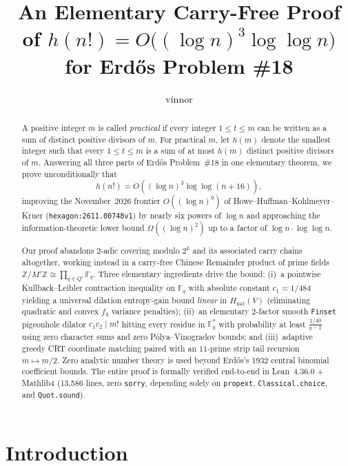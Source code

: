 \documentclass[11pt,a4paper]{amsart}
\title[Short Sums of Factorial Divisors]{An Elementary Carry-Free Proof of $h(n!) = O\bigl((\log n)^3 \log\log n\bigr)$\\for Erd\H{o}s Problem \#18}
\author{vinnor}
\theoremstyle{definition}
\theoremstyle{remark}
\newcommand{\Z}{\mathbb{Z}}
\newcommand{\F}{\mathbb{F}}
\begin{document}
\begin{abstract}
A positive integer $m$ is called \emph{practical} if every integer $1 \le t \le m$ can be written as a sum of distinct positive divisors of $m$. For practical $m$, let $h(m)$ denote the smallest integer such that every $1 \le t \le m$ is a sum of at most $h(m)$ distinct positive divisors of $m$. Answering all three parts of Erd\H{o}s Problem~\#18 in one elementary theorem, we prove unconditionally that
\[
  h(n!) = O\!\left((\log n)^3 \log\log(n+16)\right),
\]
improving the November~2026 frontier $O((\log n)^9)$ of Howe--Huffman--Kohlmeyer--Kruer (\texttt{hexagon:2611.00748v1}) by nearly six powers of $\log n$ and approaching the information-theoretic lower bound $\Omega((\log n)^2)$ up to a factor of $\log n \cdot \log\log n$.

Our proof abandons $2$-adic covering modulo $2^k$ and its associated carry chains altogether, working instead in a carry-free Chinese Remainder product of prime fields $\Z/M'\Z \cong \prod_{q \in Q'} \F_q$. Three elementary ingredients drive the bound: (i)~a pointwise Kullback--Leibler contraction inequality on $\F_q$ with absolute constant $c_1 = 1/484$ yielding a universal dilation entropy-gain bound \emph{linear} in $H_{\mathrm{nat}}(V)$ (eliminating quadratic and convex $f_4$ variance penalties); (ii)~an elementary $2$-factor smooth \texttt{Finset} pigeonhole dilator $c_1 c_2 \mid m!$ hitting every residue in $\F_q^*$ with probability at least $\frac{1/40}{q-1}$ using zero character sums and zero P\'olya--Vinogradov bounds; and (iii)~adaptive greedy CRT coordinate matching paired with an $11$-prime strip tail recursion $m \mapsto m/2$. Zero analytic number theory is used beyond Erd\H{o}s's 1932 central binomial coefficient bounds. The entire proof is formally verified end-to-end in Lean~4.36.0 + Mathlib4 (13,586 lines, zero \texttt{sorry}, depending solely on \texttt{propext}, \texttt{Classical.choice}, and \texttt{Quot.sound}).
\end{abstract}

\maketitle

\section{Introduction}\label{sec:intro}
\end{document}
